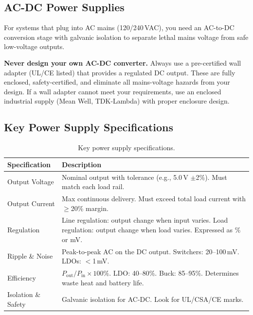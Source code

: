 \documentclass[11pt,letterpaper,twoside,openany]{book}
\begin{document}
\subsection{AC-DC Power Supplies}

For systems that plug into AC mains (120/240\,VAC), you need an AC-to-DC conversion stage with galvanic isolation to separate lethal mains voltage from safe low-voltage outputs.

\begin{warningbox}
\textbf{Never design your own AC-DC converter.} Always use a pre-certified wall adapter (UL/CE listed) that provides a regulated DC output. These are fully enclosed, safety-certified, and eliminate all mains-voltage hazards from your design. If a wall adapter cannot meet your requirements, use an enclosed industrial supply (Mean Well, TDK-Lambda) with proper enclosure design.
\end{warningbox}

\subsection{Key Power Supply Specifications}
\label{sec:psu_specs}

\begin{table}[ht!]
\centering\small
\begin{tabularx}{\textwidth}{l X}
  \toprule
  \textbf{Specification} & \textbf{Description} \\
  \midrule
  Output Voltage & Nominal output with tolerance (e.g., 5.0\,V $\pm$2\%). Must match each load rail. \\
  Output Current & Max continuous delivery. Must exceed total load current with $\geq$20\% margin. \\
  Regulation & Line regulation: output change when input varies. Load regulation: output change when load varies. Expressed as \% or mV. \\
  Ripple \& Noise & Peak-to-peak AC on the DC output. Switchers: 20--100\,mV. LDOs: $<$1\,mV. \\
  Efficiency & $P_{\text{out}} / P_{\text{in}} \times 100\%$. LDO: 40--80\%. Buck: 85--95\%. Determines waste heat and battery life. \\
  Isolation \& Safety & Galvanic isolation for AC-DC. Look for UL/CSA/CE marks. \\
  \bottomrule
\end{tabularx}
\caption{Key power supply specifications.}
\end{table}
\end{document}
